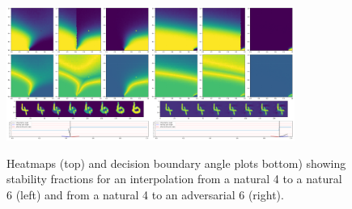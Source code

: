 \begin{figure}[ht!]
    \centering
    \includegraphics[width=0.42\textwidth]{c5_figures/stab-mnist-C32-50-50-10-0.001-eval-1e-06-none-4-6-db_interp-stability-50.png}\includegraphics[width=0.42\textwidth]{c5_figures/stab-mnist-C32-50-50-10-0.001-eval-1e-06-pgd-4-6-db_interp-stability-50.png}

    \caption{Heatmaps (top) and decision boundary angle plots bottom) showing stability fractions for an interpolation from a natural 4 to a natural 6 (left) and from a natural 4 to an adversarial 6 (right). }
    \label{fig:dbs}
\end{figure}


